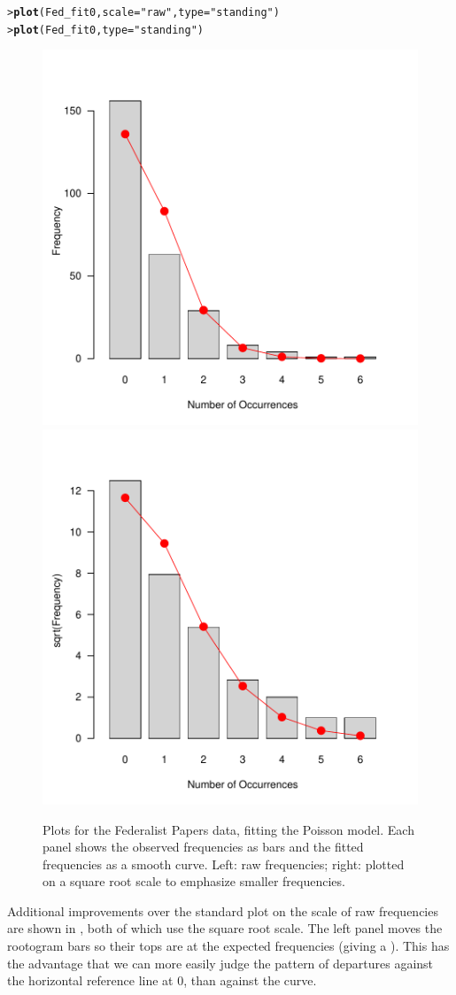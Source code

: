 \documentclass[10pt,krantz2]{krantz}\usepackage[]{graphicx}\usepackage[]{color}
\makeatletter
\newcommand{\hlstr}[1]{\textcolor[rgb]{0.192,0.494,0.8}{#1}}%
\newcommand{\hlstd}[1]{\textcolor[rgb]{0.345,0.345,0.345}{#1}}%
\newcommand{\hlkwc}[1]{\textcolor[rgb]{0.333,0.667,0.333}{#1}}%
\newcommand{\hlkwd}[1]{\textcolor[rgb]{0.737,0.353,0.396}{\textbf{#1}}}%
\newenvironment{kframe}{%
 \def\at@end@of@kframe{}%
 \ifinner\ifhmode%
  \def\at@end@of@kframe{\end{minipage}}%
  \begin{minipage}{\columnwidth}%
 \fi\fi%
 \def\FrameCommand##1{\hskip\@totalleftmargin \hskip-\fboxsep
 \colorbox{shadecolor}{##1}\hskip-\fboxsep
     \hskip-\linewidth \hskip-\@totalleftmargin \hskip\columnwidth}%
 \MakeFramed {\advance\hsize-\width
   \@totalleftmargin\z@ \linewidth\hsize
   \@setminipage}}%
 {\par\unskip\endMakeFramed%
 \at@end@of@kframe}
\newenvironment{knitrout}{}{} %
\renewenvironment{knitrout}{\small\renewcommand{\baselinestretch}{.85}}{} %
\makeatother
\begin{document}
\begin{knitrout}
\color{fgcolor}\begin{kframe}
\begin{alltt}
\hlstd{> }\hlkwd{plot}\hlstd{(Fed_fit0,} \hlkwc{scale} \hlstd{=} \hlstr{"raw"}\hlstd{,} \hlkwc{type} \hlstd{=} \hlstr{"standing"}\hlstd{)}
\hlstd{> }\hlkwd{plot}\hlstd{(Fed_fit0,} \hlkwc{type} \hlstd{=} \hlstr{"standing"}\hlstd{)}
\end{alltt}
\end{kframe}\begin{figure}[!htbp]

\centerline{\includegraphics[width=.48\textwidth]{ch03/fig/Fed0-plots1-1} 
\includegraphics[width=.48\textwidth]{ch03/fig/Fed0-plots1-2} }

\caption[Plots for the Federalist Papers data, fitting the Poisson model]{Plots for the Federalist Papers data, fitting the Poisson model. Each panel shows the observed frequencies as bars and the fitted frequencies as a smooth curve. Left: raw frequencies; right: plotted on a square root scale to emphasize smaller frequencies.\label{fig:Fed0-plots1}}
\end{figure}


\end{knitrout}
Additional improvements over the standard plot on the scale of raw
frequencies are shown in , both of which
use the square root scale.  The left panel
moves the rootogram bars so their tops
are at the expected frequencies (giving a ).
This has the advantage that we can more easily judge the pattern
of departures against the horizontal reference line at 0, than
against the curve.
\end{document}

